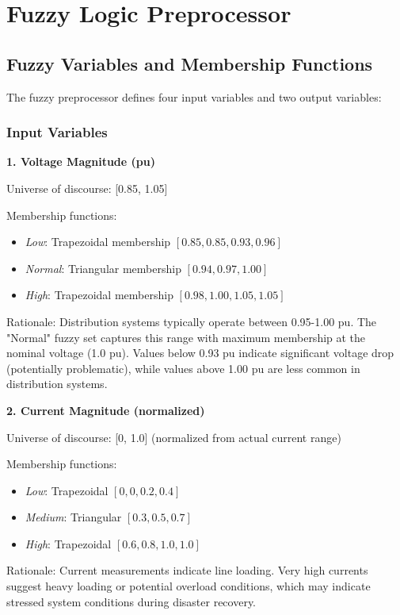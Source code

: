 \documentclass[12pt,a4paper]{report}
\begin{document}
\section{Fuzzy Logic Preprocessor}

\subsection{Fuzzy Variables and Membership Functions}

The fuzzy preprocessor defines four input variables and two output variables:

\subsubsection{Input Variables}

\textbf{1. Voltage Magnitude (pu)}

Universe of discourse: [0.85, 1.05]

Membership functions:
\begin{itemize}
    \item \textit{Low}: Trapezoidal membership $[0.85, 0.85, 0.93, 0.96]$
    \item \textit{Normal}: Triangular membership $[0.94, 0.97, 1.00]$
    \item \textit{High}: Trapezoidal membership $[0.98, 1.00, 1.05, 1.05]$
\end{itemize}

Rationale: Distribution systems typically operate between 0.95-1.00 pu. The "Normal" fuzzy set captures this range with maximum membership at the nominal voltage (1.0 pu). Values below 0.93 pu indicate significant voltage drop (potentially problematic), while values above 1.00 pu are less common in distribution systems.

\textbf{2. Current Magnitude (normalized)}

Universe of discourse: [0, 1.0] (normalized from actual current range)

Membership functions:
\begin{itemize}
    \item \textit{Low}: Trapezoidal $[0, 0, 0.2, 0.4]$
    \item \textit{Medium}: Triangular $[0.3, 0.5, 0.7]$
    \item \textit{High}: Trapezoidal $[0.6, 0.8, 1.0, 1.0]$
\end{itemize}

Rationale: Current measurements indicate line loading. Very high currents suggest heavy loading or potential overload conditions, which may indicate stressed system conditions during disaster recovery.
\end{document}
